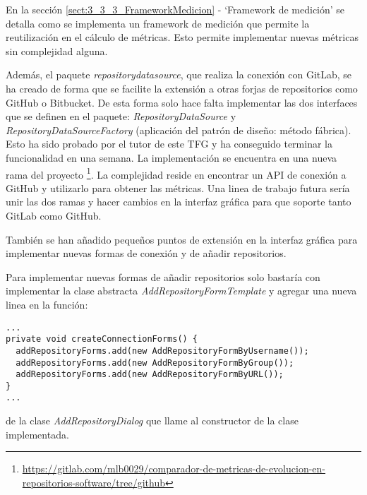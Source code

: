 En la sección \ref{sect:3_3_3_FrameworkMedicion} - `Framework de medición' se detalla como se implementa un framework de medición que permite la reutilización en el cálculo de métricas. Esto permite implementar nuevas métricas sin complejidad alguna.

Además, el paquete \textit{repositorydatasource}, que realiza la conexión con GitLab, se ha creado de forma que se facilite la extensión a otras forjas de repositorios como GitHub o Bitbucket. De esta forma solo hace falta implementar las dos interfaces que se definen en el paquete: \textit{RepositoryDataSource} y \textit{RepositoryDataSourceFactory} (aplicación del patrón de diseño: método fábrica). Esto ha sido probado por el tutor de este TFG y ha conseguido terminar la funcionalidad en una semana. La implementación se encuentra en una nueva rama del proyecto \footnote{\url{https://gitlab.com/mlb0029/comparador-de-metricas-de-evolucion-en-repositorios-software/tree/github}}. La complejidad reside en encontrar un API de conexión a GitHub y utilizarlo para obtener las métricas. Una linea de trabajo futura sería unir las dos ramas y hacer cambios en la interfaz gráfica para que soporte tanto GitLab como GitHub.

También se han añadido pequeños puntos de extensión en la interfaz gráfica para implementar nuevas formas de conexión y de añadir repositorios. 

Para implementar nuevas formas de añadir repositorios solo bastaría con implementar la clase abstracta \textit{AddRepositoryFormTemplate} y agregar una nueva linea en la función:\\
\begin{minipage}{\linewidth}
{\tiny
\begin{lstlisting}[breaklines]
...
private void createConnectionForms() {
  addRepositoryForms.add(new AddRepositoryFormByUsername());
  addRepositoryForms.add(new AddRepositoryFormByGroup());
  addRepositoryForms.add(new AddRepositoryFormByURL());
}
...
\end{lstlisting}
}
\end{minipage}
 de la clase \textit{AddRepositoryDialog} que llame al constructor de la clase implementada.
 
